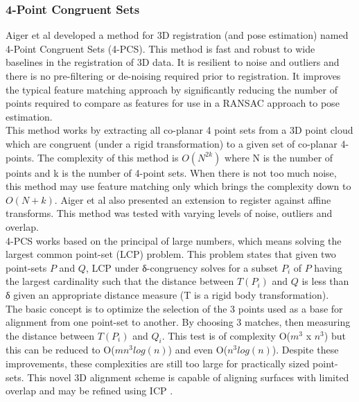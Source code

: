 \subsubsection{4-Point Congruent Sets}

Aiger et al \cite{Aiger084} developed a method for 3D registration (and pose estimation) named 4-Point Congruent Sets (4-PCS). This method is fast and robust to wide baselines in the registration of 3D data. It is resilient to noise and outliers and there is no pre-filtering or de-noising required prior to registration. It improves the typical feature matching approach by significantly reducing the number of points required to compare as features for use in a RANSAC approach to pose estimation. \\

This method works by extracting all co-planar 4 point sets from a 3D point cloud which are congruent (under a rigid transformation) to a given set of co-planar 4-points. The complexity of this method is $O(N^{2k})$ where N is the number of points and k is the number of 4-point sets. When there is not too much noise, this method may use feature matching only which brings the complexity down to $O(N+k)$. Aiger et al also presented an extension to register against affine transforms. This method was tested with varying levels of noise, outliers and overlap. \\

4-PCS works based on the principal of large numbers, which means solving the largest common point-set (LCP) problem. This problem states that given two point-sets $P$ and $Q$, LCP under δ-congruency solves for a subset $P_i$ of $P$ having the largest cardinality such that the distance between $T(P_i)$ and $Q$  is less than δ given an appropriate distance measure (T is a rigid body transformation). \\

The basic concept is to optimize the selection of the 3 points used as a base for alignment from one point-set to another. By choosing 3 matches, then measuring the distance between $T(P_i)$ and $Q_i$. This test is of complexity  O($m^3$ x $n^3$) but this can be reduced to  O($mn^3 log(n)$) \cite{Irani96Combinatorial} and even O($n^3 log(n)$). Despite these improvements, these complexities are still too large for practically sized point-sets. This novel 3D alignment scheme is capable of aligning surfaces with limited overlap and may be refined using ICP \cite{Rusinkiewicz01Efficient}. \\



